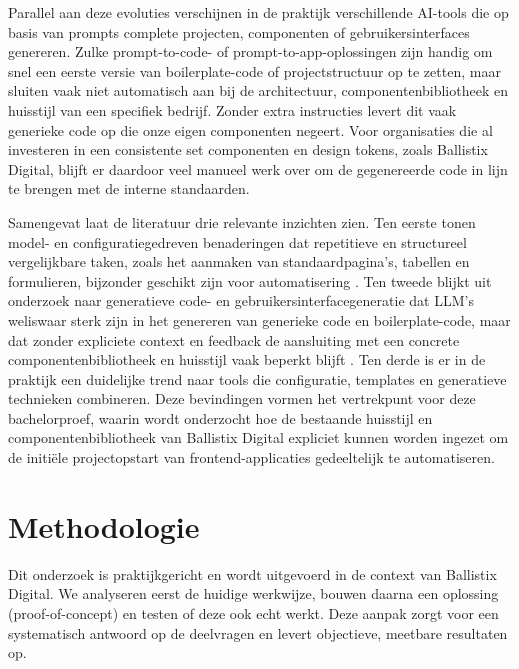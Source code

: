Parallel aan deze evoluties verschijnen in de praktijk verschillende AI-tools die op basis van prompts complete projecten, componenten of gebruikersinterfaces genereren. Zulke prompt-to-code- of prompt-to-app-oplossingen zijn handig om snel een eerste versie van boilerplate-code of projectstructuur op te zetten, maar sluiten vaak niet automatisch aan bij de architectuur, componentenbibliotheek en huisstijl van een specifiek bedrijf. Zonder extra instructies levert dit vaak generieke code op die onze eigen componenten negeert. Voor organisaties die al investeren in een consistente set componenten en design tokens, zoals Ballistix Digital, blijft er daardoor veel manueel werk over om de gegenereerde code in lijn te brengen met de interne standaarden.

Samengevat laat de literatuur drie relevante inzichten zien. Ten eerste tonen model- en configuratiegedreven benaderingen dat repetitieve en structureel vergelijkbare taken, zoals het aanmaken van standaardpagina's, tabellen en formulieren, bijzonder geschikt zijn voor automatisering \parencite{Nikiforova2025,Ourai2025}. Ten tweede blijkt uit onderzoek naar generatieve code- en gebruikersinterfacegeneratie dat LLM's weliswaar sterk zijn in het genereren van generieke code en boilerplate-code, maar dat zonder expliciete context en feedback de aansluiting met een concrete componentenbibliotheek en huisstijl vaak beperkt blijft \parencite{Zan2023NL2Code,Bistarelli2025LLMCodeReview,Wu2024UICoder}. Ten derde is er in de praktijk een duidelijke trend naar tools die configuratie, templates en generatieve technieken combineren. Deze bevindingen vormen het vertrekpunt voor deze bachelorproef, waarin wordt onderzocht hoe de bestaande huisstijl en componentenbibliotheek van Ballistix Digital expliciet kunnen worden ingezet om de initiële projectopstart van frontend-applicaties gedeeltelijk te automatiseren.


\section{Methodologie}
Dit onderzoek is praktijkgericht en wordt uitgevoerd in de context van Ballistix Digital. We analyseren eerst de huidige werkwijze, bouwen daarna een oplossing (proof-of-concept) en testen of deze ook echt werkt. Deze aanpak zorgt voor een systematisch antwoord op de deelvragen en levert objectieve, meetbare resultaten op.

